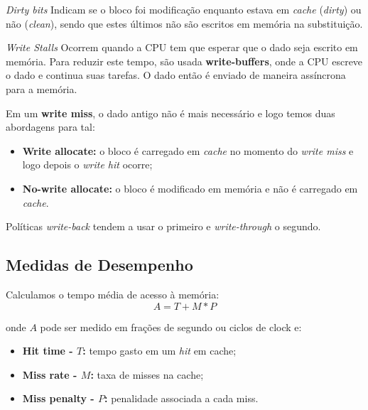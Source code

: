 \begin{definicao}{\textit{Dirty bits}}
  Indicam se o bloco foi modificação enquanto estava em \textit{cache} (\textit{dirty}) ou não (\textit{clean}), sendo que estes últimos não são escritos em memória na substituição.
\end{definicao}

\begin{definicao}{\textit{Write Stalls}}
   Ocorrem quando a CPU tem que esperar que o dado seja escrito em memória. Para reduzir este tempo, são usada \textbf{write-buffers}, onde a CPU escreve o dado e continua suas tarefas. O dado então é enviado de maneira assíncrona para a memória.
\end{definicao}

Em um \textbf{write miss}, o dado antigo não é mais necessário e logo temos duas abordagens para tal:
\begin{itemize}
  \item \textbf{Write allocate:} o bloco é carregado em \textit{cache} no momento do \textit{write miss} e logo depois o \textit{write hit} ocorre;

  \item \textbf{No-write allocate:} o bloco é modificado em memória e não é carregado em \textit{cache}.
\end{itemize}

Políticas \textit{write-back} tendem a usar o primeiro e \textit{write-through} o segundo.

\subsection{Medidas de Desempenho}
Calculamos o tempo média de acesso à memória:
\begin{equation}
  A = T + M * P
\end{equation}

onde $A$ pode ser medido em frações de segundo ou ciclos de clock e:

\begin{itemize}
  \item \textbf{Hit time - $T$:} tempo gasto em um \textit{hit} em cache;
  \item \textbf{Miss rate - $M$:} taxa de misses na cache;
  \item \textbf{Miss penalty - $P$:} penalidade associada a cada miss.
\end{itemize}






